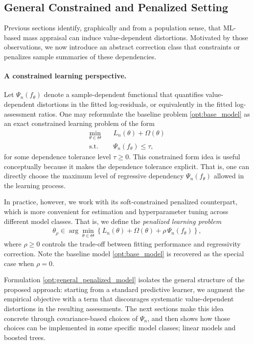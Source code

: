 \documentclass[12pt, draft]{article}
\theoremstyle{plain}
\theoremstyle{definition}
\newcommand{\1}{\mathbf{1}}
\begin{document}
{\subsection{General Constrained and Penalized Setting}
\label{subsec:general_penalized_setting}

Previous sections identify, graphically and from a population sense, that ML-based mass appraisal can induce value-dependent distortions. Motivated by those observations, we now introduce an abstract correction class that constraints or penalizes sample summaries of these dependencies.

\paragraph{A constrained learning perspective.} Let $\Psi_n(f_\theta)$ denote a sample-dependent functional that quantifies value-dependent distortions in the fitted log-residuals, or equivalently in the fitted log-assessment ratios. One may reformulate the baseline problem \eqref{opt:base_model} as an exact constrained learning problem of the form
\begin{align}
\label{opt:general_constrained_model}
\min_{\theta\in\Theta}
\quad
& L_n(\theta)+\Omega(\theta)
\\
\text{s.t.}\quad
& \Psi_n(f_\theta)\le \tau,
\nonumber
\end{align}
for some dependence tolerance level $\tau\ge 0$. This constrained form idea is useful conceptually because it makes the dependence tolerance explicit. That is, one can directly choose the maximum level of regressive dependency $\Psi_n(f_\theta)$ allowed in the learning process. 


In practice, however, we work with its soft-constrained penalized counterpart, which is more convenient for estimation and hyperparameter tuning across different model classes. That is, we define the \textit{penalized learning problem}
\begin{align}
\label{opt:general_penalized_model}
\theta_\rho
\in
\arg\min_{\theta\in\Theta}
\left\{
L_n(\theta)+\Omega(\theta)+\rho\,\Psi_n(f_\theta)
\right\},
\end{align}
where $\rho\ge 0$ controls the trade-off between fitting performance and regressivity correction. Note the baseline model \eqref{opt:base_model} is recovered as the special case when $\rho=0$.

Formulation \eqref{opt:general_penalized_model} isolates the general structure of the proposed approach: starting from a standard predictive learner, we augment the empirical objective with a term that discourages systematic value-dependent distortions in the resulting assessments. The next sections make this idea concrete through covariance-based choices of $\Psi_n$, and then shows how those choices can be implemented in some specific model classes; linear models and boosted trees.

}
\end{document}
